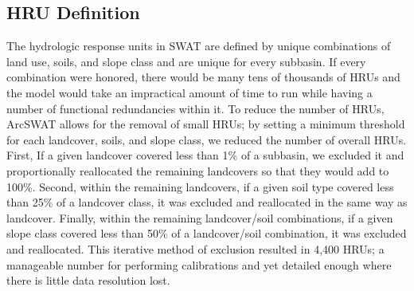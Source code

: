 \subsection{HRU Definition}\label{sec:hru_definition}

The hydrologic response units in SWAT are defined by unique combinations of land use, soils, and slope class and are unique for every subbasin. If every combination were honored, there would be many tens of thousands of HRUs and the model would take an impractical amount of time to run while having a number of functional redundancies within it. To reduce the number of HRUs, ArcSWAT allows for the removal of small HRUs; by setting a minimum threshold for each landcover, soils, and slope class, we reduced the number of overall HRUs. First, If a given landcover covered less than 1\% of a subbasin, we excluded it and proportionally reallocated the remaining landcovers so that they would add to 100\%.  Second, within the remaining landcovers, if a given soil type covered less than 25\% of a landcover class, it was excluded and reallocated in the same way as landcover. Finally, within the remaining landcover/soil combinations, if a given slope class covered less than 50\% of a landcover/soil combination, it was excluded and reallocated. This iterative method of exclusion resulted in 4,400 HRUs; a manageable number for performing calibrations and yet detailed enough where there is little data resolution lost.